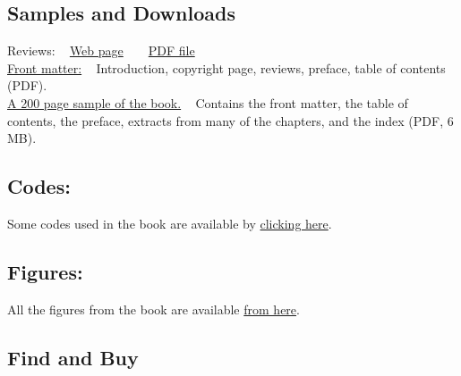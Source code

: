 \subsection{Samples and Downloads}\label{samples-and-downloads}

Reviews: ~ \href{../aofdreviews/index.html}{Web page} ~ ~
\href{reviews.pdf}{PDF
file}\\[2\baselineskip]\href{front-matter.pdf}{Front matter:} ~
Introduction, copyright page, reviews, preface, table of contents
(PDF).\\[2\baselineskip]\href{aofd-sample.pdf}{A 200 page sample of the
book.} ~ Contains the front matter, the table of contents, the preface,
extracts from many of the chapters, and the index (PDF, 6
MB).\\[2\baselineskip]

\subsection{Codes:}\label{codes}

Some codes used in the book are available by
\href{../codes/index.html}{clicking here}.\\[2\baselineskip]

\subsection{Figures:}\label{figures}

All the figures from the book are available
\href{../aofdfigures/index.html}{from here}.\\[3\baselineskip]

\subsection{Find and Buy}\label{find-and-buy}

